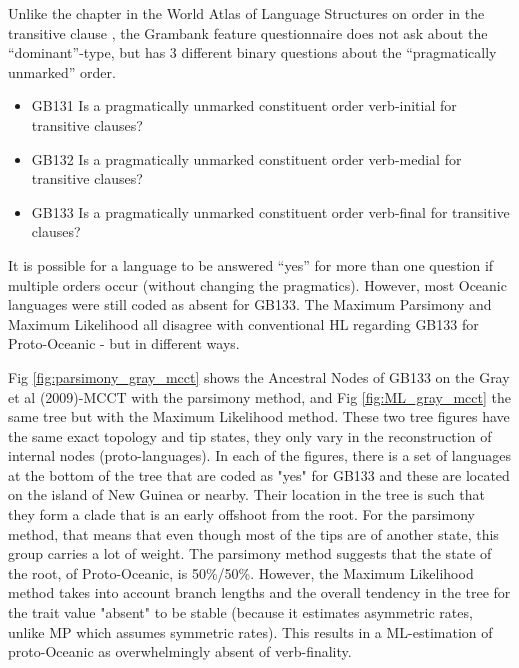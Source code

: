 \documentclass[12pt,letterpaper]{article}
\begin{document}
Unlike the chapter in the World Atlas of Language Structures on order in the transitive clause \citep{wals-81}, the Grambank feature questionnaire does not ask about the ``dominant''-type, but has 3 different binary questions about the ``pragmatically unmarked'' order. 

{\small
\begin{itemize}
    \item GB131 Is a pragmatically unmarked constituent order verb-initial for transitive clauses?
    \item GB132 Is a pragmatically unmarked constituent order verb-medial for transitive clauses?
    \item GB133 Is a pragmatically unmarked constituent order verb-final for transitive clauses?
\end{itemize}

 }
 
It is possible for a language to be answered ``yes'' for more than one question if multiple orders occur (without changing the pragmatics). However, most Oceanic languages were still coded as absent for GB133. The Maximum Parsimony and Maximum Likelihood all disagree with conventional HL regarding GB133 for Proto-Oceanic - but in different ways.

Fig \ref{fig:parsimony_gray_mcct} shows the Ancestral Nodes of GB133 on the Gray et al (2009)-MCCT with the parsimony method, and Fig \ref{fig:ML_gray_mcct} the same tree but with the Maximum Likelihood method. These two tree figures have the same exact topology and tip states, they only vary in the reconstruction of internal nodes (proto-languages). In each of the figures, there is a set of languages at the bottom of the tree that are coded as "yes" for  GB133 and these are located on the island of New Guinea or nearby. Their location in the tree is such that they form a clade that is an early offshoot from the root. For the parsimony method, that means that even though most of the tips are of another state, this group carries a lot of weight. The parsimony method suggests that the state of the root, of Proto-Oceanic, is 50\%/50\%. However, the Maximum Likelihood method takes into account branch lengths and the overall tendency in the tree for the trait value "absent" to be stable (because it estimates asymmetric rates, unlike MP which assumes symmetric rates). This results in a ML-estimation of proto-Oceanic as overwhelmingly absent of verb-finality.
\end{document}
